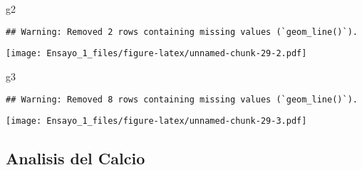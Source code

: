 \documentclass[
]{article}
\newenvironment{Shaded}{\begin{snugshade}}{\end{snugshade}}
\newcommand{\NormalTok}[1]{#1}
\begin{document}
\begin{Shaded}
\begin{Highlighting}[]
\NormalTok{g2}
\end{Highlighting}
\end{Shaded}

\begin{verbatim}
## Warning: Removed 2 rows containing missing values (`geom_line()`).
\end{verbatim}

\texttt{[image: Ensayo\_1\_files/figure-latex/unnamed-chunk-29-2.pdf]}

\begin{Shaded}
\begin{Highlighting}[]
\NormalTok{g3}
\end{Highlighting}
\end{Shaded}

\begin{verbatim}
## Warning: Removed 8 rows containing missing values (`geom_line()`).
\end{verbatim}

\texttt{[image: Ensayo\_1\_files/figure-latex/unnamed-chunk-29-3.pdf]}

\hypertarget{analisis-del-calcio}{%
\subsection{Analisis del Calcio}\label{analisis-del-calcio}}
\end{document}
